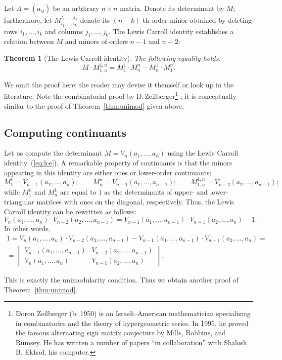 \documentclass[a4paper,11pt]{amsart}
\theoremstyle{plain}
\newtheorem{theorem}{Theorem}[section]
\theoremstyle{remark}
\theoremstyle{definition}
\numberwithin{equation}{section}
\numberwithin{figure}{section}
\begin{document}
{Let $A=(a_{ij})$ be an arbitrary $n\times n$ matrix. Denote its determinant by $M$; furthermore, let $M_{i_1,\dots,i_k}^{j_1,\dots,j_k}$ denote its $(n-k)$-th order minor obtained by deleting rows $i_1,\dots,i_k$ and columns $j_1,\dots, j_k$. The Lewis Carroll identity establishes a relation between $M$ and minors of orders $n-1$ and $n-2$:
\begin{theorem}[The Lewis Carroll identity]\label{thm:lcidentity}
The following equality holds:
\begin{equation}\label{eq:lce}
M\cdot M_{1,n}^{1,n}=M_1^1\cdot M_n^n-M_n^1\cdot M_1^n.
\end{equation}
\end{theorem}

We omit the proof here; the reader may devise it themself or look up in the literature. Note the combinatorial proof by D.\,Zeilberger\footnote{Doron Zeilberger (b. 1950) is an Israeli--American mathematician specializing in combinatorics and the theory of hypergeometric series. In 1995, he proved the famous alternating sign matrix conjecture by Mills, Robbins, and Rumsey. He has written a number of papers ``in collaboration'' with Shalosh B. Ekhad, his computer.} \cite{Zeilberger97}; it is conceptually similar to the proof of Theorem~\ref{thm:unimod} given above. 

\subsection{Computing continuants} \label{ssec:cont}

Let us compute the determinant $M=V_n(a_1,\dots,a_n)$ using the Lewis Carroll identity~(\ref{eq:lce}). A remarkable property of continuants is that the minors appearing in this  identity are either ones or lower-order continuants:
\[
M_1^1=V_{n-1}(a_2,\dots,a_n);\qquad M_n^n=V_{n-1}(a_1,\dots,a_{n-1});\qquad M_{1,n}^{1,n}=V_{n-2}(a_2,\dots,a_{n-1});
\]
while $M_1^n$ and $M_n^1$ are equal to 1 as the determinants of upper- and lower-triangular matrices with ones on the diagonal, respectively. Thus, the Lewis Carroll identity can be rewritten as follows:
\[
V_n(a_1,\dots,a_n)\cdot V_{n-2}(a_2,\dots,a_{n-1})=V_{n-1}(a_1,\dots,a_{n-1})\cdot V_{n-1}(a_2,\dots,a_{n})-1.
\]
In other words,
\begin{multline*}
1=V_n(a_1,\dots,a_n)\cdot V_{n-2}(a_2,\dots,a_{n-1})-V_{n-1}(a_1,\dots,a_{n-1})\cdot V_{n-1}(a_2,\dots,a_{n})=\\
=\begin{vmatrix}
V_{n-1}(a_1,\dots,a_{n-1}) & V_{n-2}(a_2,\dots,a_{n-1})\\
V_n(a_1,\dots,a_n) & V_{n-1}(a_2,\dots,a_{n})
\end{vmatrix}
.
\end{multline*}

This is exactly the unimodularity condition. Thus we obtain another proof of Theorem~\ref{thm:unimod}.

}
\end{document}
